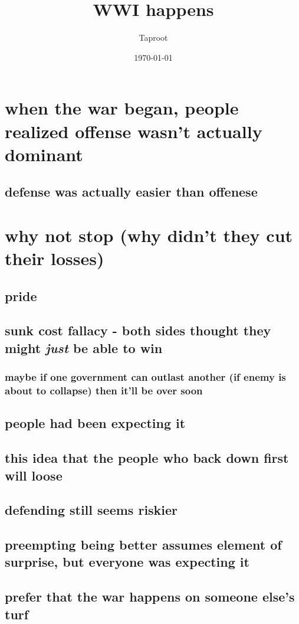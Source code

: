 \documentclass[letterpaper]{article}
\author{Taproot}
\date{\today}
\title{WWI happens}
\renewcommand{\tableofcontents}{}
\begin{document}
\tableofcontents

\section{when the war began, people realized offense wasn't actually dominant}
\label{sec:org2a5ae56}
\subsection{defense was actually easier than offenese}
\label{sec:orgf09eb88}
\section{why not stop (why didn't they cut their losses)}
\label{sec:orgf76f7db}
\subsection{pride}
\label{sec:org74c724f}
\subsection{sunk cost fallacy - both sides thought they might \emph{just} be able to win}
\label{sec:org66fa873}
\subsubsection{maybe if one government can outlast another (if enemy is about to collapse) then it'll be over soon}
\label{sec:org9824059}
\subsection{people had been expecting it}
\label{sec:org6ad273b}
\subsection{this idea that the people who back down first will loose}
\label{sec:orgf4ec6a2}
\subsection{defending still seems riskier}
\label{sec:org79a6b14}
\subsection{preempting being better assumes element of surprise, but everyone was expecting it}
\label{sec:org04067fb}
\subsection{prefer that the war happens on someone else's turf}
\label{sec:org1c89cb0}
\end{document}
